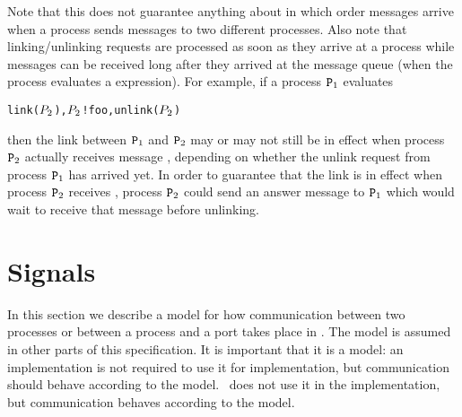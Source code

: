 Note that this does not guarantee anything about in which order messages arrive when a process
sends messages to two different processes.  Also note that linking/unlinking requests are
processed as soon as they arrive at a process while messages can be received long after they
arrived at the message queue (when the process evaluates a  expression).
For example, if a process ${\tt{\sl P}}_1$ evaluates
\begin{alltt}
link(\(\Z{P}\sb{2}\)), \(\Z{P}\sb{2}\) ! foo, unlink(\(\Z{P}\sb{2}\))
\end{alltt}
then the link between ${\tt{\sl P}}_1$ and ${\tt{\sl P}}_2$ may or may not still be in effect when process
${\tt{\sl P}}_2$ actually receives message , depending on whether the unlink request
from process ${\tt{\sl P}}_1$ has arrived yet.  In order to guarantee that the link is in effect
when process ${\tt{\sl P}}_2$ receives , process ${\tt{\sl P}}_2$ could send an answer message
to ${\tt{\sl P}}_1$ which would wait to receive that message before unlinking.

\section{Signals}

\label{section:signals}

In this section we describe a model for how communication between two processes
or between a process and a port takes place in \Erlang.  The model is assumed in
other parts of this specification.  It is important that it is a model:
\ifNew
an implementation is not required to use it for implementation, but communication
should behave according to the model.
\fi
\ifOld
\OldErlang\ does not use it in the implementation,
but communication behaves according to the model.
\fi

